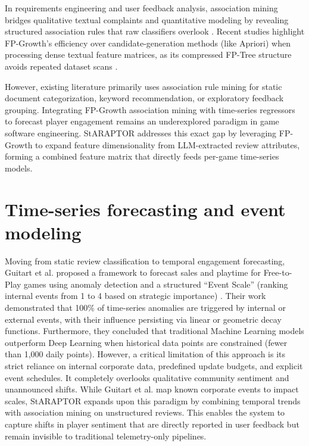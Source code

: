 In requirements engineering and user feedback analysis, association mining bridges qualitative textual complaints and quantitative modeling by revealing structured association rules that raw classifiers overlook \cite{sulianta2024advancements_arm}. Recent studies highlight FP-Growth's efficiency over candidate-generation methods (like Apriori) when processing dense textual feature matrices, as its compressed FP-Tree structure avoids repeated dataset scans \cite{wu2024icfm_fpgrowth}. 

However, existing literature primarily uses association rule mining for static document categorization, keyword recommendation, or exploratory feedback grouping. Integrating FP-Growth association mining with time-series regressors to forecast player engagement remains an underexplored paradigm in game software engineering. StARAPTOR addresses this exact gap by leveraging FP-Growth to expand feature dimensionality from LLM-extracted review attributes, forming a combined feature matrix that directly feeds per-game time-series models.

\section{Time-series forecasting and event modeling} 
\noindent Moving from static review classification to temporal engagement forecasting, Guitart et al. proposed a framework to forecast sales and playtime for Free-to-Play games using anomaly detection and a structured ``Event Scale'' (ranking internal events from 1 to 4 based on strategic importance) \cite{guitart_forecasting}. Their work demonstrated that 100\% of time-series anomalies are triggered by internal or external events, with their influence persisting via linear or geometric decay functions. Furthermore, they concluded that traditional Machine Learning models outperform Deep Learning when historical data points are constrained (fewer than 1,000 daily points). However, a critical limitation of this approach is its strict reliance on internal corporate data, predefined update budgets, and explicit event schedules. It completely overlooks qualitative community sentiment and unannounced shifts. While Guitart et al. map known corporate events to impact scales, StARAPTOR expands upon this paradigm by combining temporal trends with association mining on unstructured reviews. This enables the system to capture shifts in player sentiment that are directly reported in user feedback but remain invisible to traditional telemetry-only pipelines.

